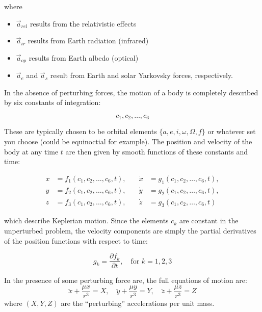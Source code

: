 \documentclass{article}
\begin{document}
\noindent
where 
\begin{itemize}
    \item \( \vec{a}_{rel} \) results from the relativistic effects \\
    \item \( \vec{a}_{ir} \) results from Earth radiation (infrared) \\ 
    \item \( \vec{a}_{op} \) results from Earth albedo (optical) \\  
    \item \( \vec{a}_e \) and \( \vec{a}_s \) result from Earth and solar Yarkovsky forces, respectively.  
\end{itemize}

\noindent In the absence of perturbing forces, the motion of a body is completely described by six constants of integration:

\[
c_1, c_2, \dots, c_6
\]

These are typically chosen to be orbital elements $\{a, e, i, \omega, \Omega, f\}$ or whatever set you choose (could be equinoctial for example). The position and velocity of the body at any time \( t \) are then given by smooth functions of these constants and time:

\begin{equation}
\begin{aligned}
x &= f_1(c_1, c_2, \dots, c_6, t), &\quad \dot{x} &= g_1(c_1, c_2, \dots, c_6, t), \\
y &= f_2(c_1, c_2, \dots, c_6, t), &\quad \dot{y} &= g_2(c_1, c_2, \dots, c_6, t), \\
z &= f_3(c_1, c_2, \dots, c_6, t), &\quad \dot{z} &= g_3(c_1, c_2, \dots, c_6, t)
\end{aligned}
\end{equation}

which describe Keplerian motion. Since the elements \( c_k \) are constant in the unperturbed problem, the velocity components are simply the partial derivatives of the position functions with respect to time:

\begin{equation}
g_k = \frac{\partial f_k}{\partial t}, \quad \text{for } k = 1, 2, 3
\end{equation}

\noindent In the presence of some perturbing force are, the full equations of motion are:
\begin{equation}
\ddot{x} + \frac{\mu x}{r^3} = X, \quad
\ddot{y} + \frac{\mu y}{r^3} = Y, \quad
\ddot{z} + \frac{\mu z}{r^3} = Z
\end{equation}
where \( (X, Y, Z) \) are the ``perturbing'' accelerations per unit mass. 
\end{document}
